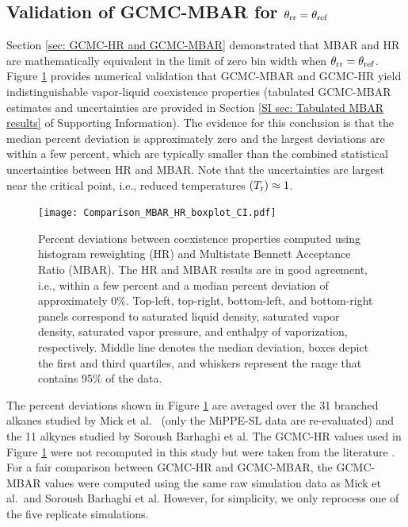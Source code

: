 \documentclass[journal=jced,manuscript=article]{achemso}
\begin{document}
\subsection{Validation of GCMC-MBAR for $\theta_{\rm rr} = \theta_{\rm ref}$} \label{sec: Constant theta} 

Section \ref{sec: GCMC-HR and GCMC-MBAR} demonstrated that MBAR and HR are mathematically equivalent in the limit of zero bin width when $\theta_{\rm rr} = \theta_{\rm ref}$. Figure \ref{fig:comparison MBAR HR} provides numerical validation that GCMC-MBAR and GCMC-HR yield indistinguishable vapor-liquid coexistence properties (tabulated GCMC-MBAR estimates and uncertainties are provided in Section \ref{SI sec: Tabulated MBAR results} of Supporting Information). The evidence for this conclusion is that the median percent deviation is approximately zero and the largest deviations are within a few percent, which are typically smaller than the combined statistical uncertainties between HR and MBAR. Note that the uncertainties are largest near the critical point, i.e., reduced temperatures $(T_{\rm r}) \approx 1$. 

	\begin{figure}[htb!]
		\centering
		\texttt{[image: Comparison\_MBAR\_HR\_boxplot\_CI.pdf]}
		\caption{Percent deviations between coexistence properties computed using histogram reweighting (HR) and Multistate Bennett Acceptance Ratio (MBAR). The HR and MBAR results are in good agreement, i.e., within a few percent and a median percent deviation of approximately 0\%. Top-left, top-right, bottom-left, and bottom-right panels correspond to saturated liquid density, saturated vapor density, saturated vapor pressure, and enthalpy of vaporization, respectively. Middle line denotes the median deviation, boxes depict the first and third quartiles, and whiskers represent the range that contains 95\% of the data.}
		\label{fig:comparison MBAR HR}
	\end{figure}

The percent deviations shown in Figure \ref{fig:comparison MBAR HR} are averaged over the 31 branched alkanes studied by Mick et al.\cite{Potoff_branched}~ (only the MiPPE-SL data are re-evaluated) and the 11 alkynes studied by Soroush Barhaghi et al.\cite{Barhaghi2017} The GCMC-HR values used in Figure \ref{fig:comparison MBAR HR} were not recomputed in this study but were taken from the literature \cite{Potoff_branched,Barhaghi2017}. For a fair comparison between GCMC-HR and GCMC-MBAR, the GCMC-MBAR values were computed using the same raw simulation data as Mick et al.~and Soroush Barhaghi et al. However, for simplicity, we only reprocess one of the five replicate simulations.
\end{document}

